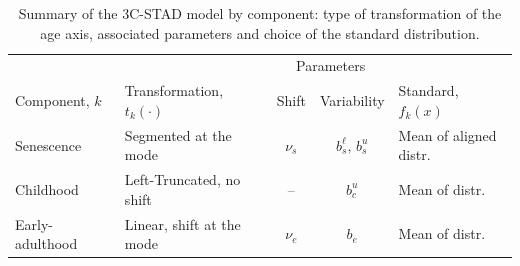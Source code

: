\documentclass[11pt, a4paper]{article}
\begin{document}
\begin{table}[t]
	\centering
	\begin{tabular}{l|l|c|c|l}
		\multicolumn{1}{c|}{}                                & \multicolumn{1}{c|}{}                                                 & \multicolumn{2}{c|}{Parameters}         & \multicolumn{1}{c}{}                                  \\
		\multicolumn{1}{l|}{\multirow{-2}{*}{Component, $k$}} & \multicolumn{1}{l|}{\multirow{-2}{*}{Transformation, $t_{k}(\cdot)$}} & Shift     & {\color{red}Variability} & \multicolumn{1}{l}{\multirow{-2}{*}{Standard, $f_{k}(x)$}} \\ \midrule 
		\rowcolor{my-grey}  
		Senescence                                           & Segmented at the mode                                                 & $\nu_{s}$ & $b_{s}^{\ell},\,b_{s}^{u}$  & Mean of aligned distr.                                \\
		Childhood                                            & Left-Truncated, no shift                                              & --        & $b_{c}^{u}$                 & Mean of distr.                                        \\
		\rowcolor{my-grey} 
		Early-adulthood $\;$                                          & Linear, shift at the mode $\;$                                            & $\nu_{e}$ & $b_{e}$                     & Mean of distr.       \\ 
		
		\bottomrule                                  
	\end{tabular}
	\caption{Summary of the 3C-STAD model by component: type of transformation of the age axis, associated parameters and choice of the standard distribution.}\label{Table:Model}
\end{table}
\end{document}
